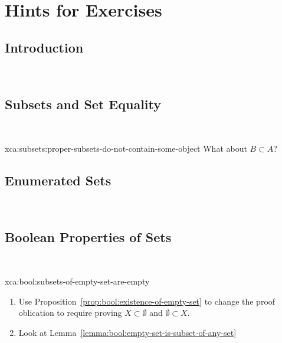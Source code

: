 \section{Hints for Exercises}

\subsection{Introduction} \
\subsection{Subsets and Set Equality} \

\begin{hint}{xca:subsets:proper-subsets-do-not-contain-some-object}
What about $B\subset A$?
\end{hint}

\subsection{Enumerated Sets} \
\subsection{Boolean Properties of Sets} \ 

\begin{hint}{xca:bool:subsets-of-empty-set-are-empty}
\begin{enumerate}
\item Use Proposition~\ref{prop:bool:existence-of-empty-set} to change the
proof oblication to require proving $X\subset\emptyset$ and $\emptyset\subset X$.
\item Look at Lemma~\ref{lemma:bool:empty-set-is-subset-of-any-set}
\end{enumerate}
\end{hint}
